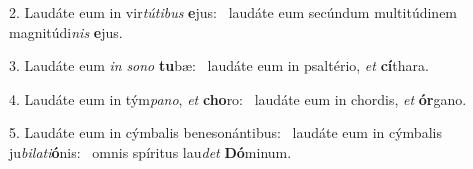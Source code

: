 2. Laudáte eum in vir\textit{tú}\textit{ti}\textit{bus} \textbf{e}jus: \ast\  laudáte eum secúndum multitúdinem magnitúdi\textit{nis} \textbf{e}jus.\

3. Laudáte eum \textit{in} \textit{so}\textit{no} \textbf{tu}bæ: \ast\  laudáte eum in psaltério, \textit{et} \textbf{cí}thara.\

4. Laudáte eum in tým\textit{pa}\textit{no}, \textit{et} \textbf{cho}ro: \ast\  laudáte eum in chordis, \textit{et} \textbf{ór}gano.\

5. Laudáte eum in cýmbalis benesonántibus: \dag\  laudáte eum in cýmbalis ju\textit{bi}\textit{la}\textit{ti}\textbf{ó}nis: \ast\  omnis spíritus lau\textit{det} \textbf{Dó}minum.\

